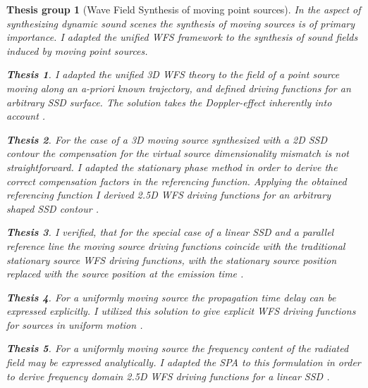 \documentclass[10pt,twoside]{article}
\theoremstyle{thesisgroupstyle}
\newtheorem{thesisgroup}{Thesis group}
\theoremstyle{indented}
\newtheorem{thesis}{Thesis}[thesisgroup]
\begin{document}
\begin{thesisgroup}[Wave Field Synthesis of moving point sources]
In the aspect of synthesizing dynamic sound scenes the synthesis of moving sources is of primary importance.
I adapted the unified WFS framework to the synthesis of sound fields induced by moving point sources.
\begin{thesis}
I adapted the unified 3D WFS theory to the field of a point source moving along an a-priori known trajectory, and defined driving functions for an arbitrary SSD surface.
The solution takes the Doppler-effect inherently into account \cite{Firtha2015:daga_booklet, firtha2016wave_booklet, doi:10.1121/1.4996126_booklet}.\end{thesis}
\begin{thesis}
For the case of a 3D moving source synthesized with a 2D SSD contour the compensation for the virtual source dimensionality mismatch is not straightforward.
I adapted the stationary phase method in order to derive the correct compensation factors in the referencing function. 
Applying the obtained referencing function I derived 2.5D WFS driving functions for an arbitrary shaped SSD contour \cite{doi:10.1121/1.4996126_booklet}.
\end{thesis}
\begin{thesis}
I verified, that for the special case of a linear SSD and a parallel reference line the moving source driving functions coincide with the traditional stationary source WFS driving functions, with the stationary source position replaced with the source position at the emission time \cite{doi:10.1121/1.4996126_booklet}.
\end{thesis}
\begin{thesis}
For a uniformly moving source the propagation time delay can be expressed explicitly.
I utilized this solution to give explicit WFS driving functions for sources in uniform motion \cite{firtha2016wave_booklet}.
\end{thesis}
\begin{thesis}
For a uniformly moving source the frequency content of the radiated field may be expressed analytically.
I adapted the SPA to this formulation in order to derive frequency domain 2.5D WFS driving functions for a linear SSD \cite{firtha2015sound_booklet}.
\end{thesis}
\end{thesisgroup}
\end{document}
